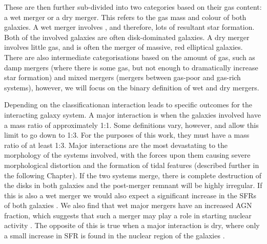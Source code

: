 These are then further sub-divided into two \DIFdelbegin {}\DIFdelend \DIFaddbegin {}\DIFaddend categories based on their gas content: a wet merger or a dry merger. This refers to the gas mass and colour of both galaxies. A wet merger involves \DIFdelbegin {}\DIFdelend \DIFaddbegin {}\DIFaddend , and therefore, lots of resultant star formation. Both of the involved galaxies are \DIFdelbegin {}\DIFdelend often disk-dominated galaxies. A dry merger involves little gas, and is often the merger of massive, red elliptical galaxies. There are also intermediate categorisations based on the amount of gas, such as damp mergers (where there is some gas, but not enough to dramatically increase star formation) and mixed mergers (mergers between gas-poor and gas-rich systems), however, we will focus on the binary definition of wet and dry mergers.

Depending on the classification\DIFdelbegin {}\DIFdelend \DIFaddbegin \DIFadd{, }\DIFaddend an interaction leads to specific outcomes for the interacting galaxy system. A major interaction is when the galaxies involved have a mass ratio of approximately 1:1. Some definitions vary, however, and allow this limit to go down to 1:3. For the purposes of this work, they must have a mass ratio of at least 1:3. Major interactions are the most devastating to the morphology of the systems involved, with the forces upon them causing severe morphological distortion and the formation of tidal features (described further in the following Chapter). If the two systems merge, there is complete destruction of the disks in both galaxies and the post-merger remnant will be highly irregular. If this is also a wet merger \DIFdelbegin {}\DIFdelend we would also expect a significant increase in the SFRs of both galaxies \citep{1994ApJ...425L..13M, 1996ApJ...464..641M, 2006AJ....132..197W}. We also find that wet major mergers have an increased AGN fraction, which suggests that such a merger may play a role in starting nuclear activity \citep{2007MNRAS.375.1017A, 2011MNRAS.418.2043E, 2012ApJ...746L..22K}. The opposite of this is true when a major interaction is dry, where only a small increase in SFR is found in the nuclear region of the galaxies \citep{2004ApJ...614..586S, 2006ApJ...640..241B}.

